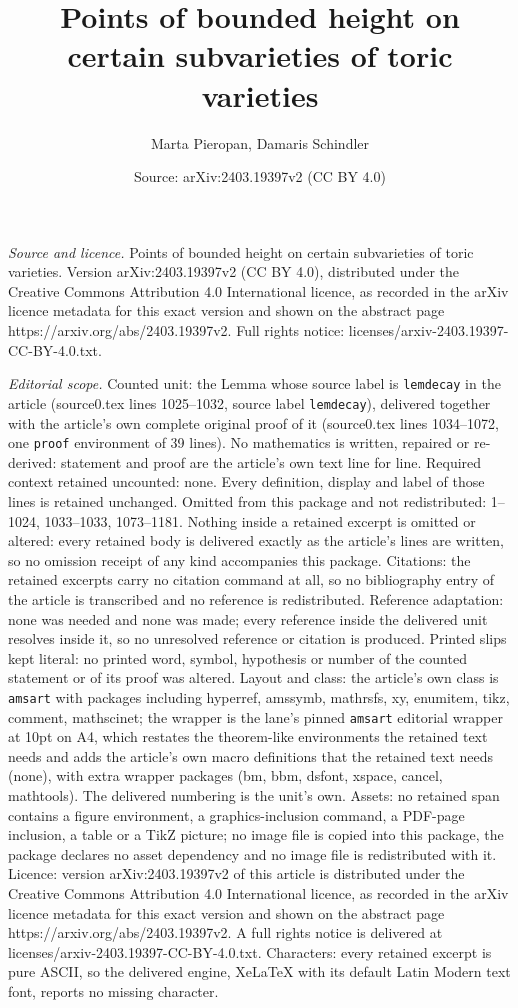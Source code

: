\documentclass[10pt,a4paper]{amsart}
\title[Points of bounded height on certain subvarieties of toric va]{Points of bounded height on certain subvarieties of toric varieties}
\author{Marta Pieropan, Damaris Schindler}
\date{Source: arXiv:2403.19397v2 (CC BY 4.0)}
\begin{document}
\maketitle

\noindent\emph{Source and licence.} Points of bounded height on certain subvarieties of toric varieties. Version arXiv:2403.19397v2 (CC BY 4.0), distributed under the Creative Commons Attribution 4.0 International licence, as recorded in the arXiv licence metadata for this exact version and shown on the abstract page https://arxiv.org/abs/2403.19397v2. Full rights notice: licenses/arxiv-2403.19397-CC-BY-4.0.txt.\par\smallskip

\noindent\textit{Editorial scope.} Counted unit: the Lemma whose source label is \texttt{lemdecay} in the article (source0.tex lines 1025--1032, source label \texttt{lemdecay}), delivered together with the article's own complete original proof of it (source0.tex lines 1034--1072, one \texttt{proof} environment of 39 lines). No mathematics is written, repaired or re-derived: statement and proof are the article's own text line for line. Required context retained uncounted: none. Every definition, display and label of those lines is retained unchanged. Omitted from this package and not redistributed: 1--1024, 1033--1033, 1073--1181. Nothing inside a retained excerpt is omitted or altered: every retained body is delivered exactly as the article's lines are written, so no omission receipt of any kind accompanies this package. Citations: the retained excerpts carry no citation command at all, so no bibliography entry of the article is transcribed and no reference is redistributed. Reference adaptation: none was needed and none was made; every reference inside the delivered unit resolves inside it, so no unresolved reference or citation is produced. Printed slips kept literal: no printed word, symbol, hypothesis or number of the counted statement or of its proof was altered. Layout and class: the article's own class is \texttt{amsart} with packages including hyperref, amssymb, mathrsfs, xy, enumitem, tikz, comment, mathscinet; the wrapper is the lane's pinned \texttt{amsart} editorial wrapper at 10pt on A4, which restates the theorem-like environments the retained text needs and adds the article's own macro definitions that the retained text needs (none), with extra wrapper packages (bm, bbm, dsfont, xspace, cancel, mathtools). The delivered numbering is the unit's own. Assets: no retained span contains a figure environment, a graphics-inclusion command, a PDF-page inclusion, a table or a TikZ picture; no image file is copied into this package, the package declares no asset dependency and no image file is redistributed with it. Licence: version arXiv:2403.19397v2 of this article is distributed under the Creative Commons Attribution 4.0 International licence, as recorded in the arXiv licence metadata for this exact version and shown on the abstract page https://arxiv.org/abs/2403.19397v2. A full rights notice is delivered at licenses/arxiv-2403.19397-CC-BY-4.0.txt. Characters: every retained excerpt is pure ASCII, so the delivered engine, XeLaTeX with its default Latin Modern text font, reports no missing character.
\end{document}
